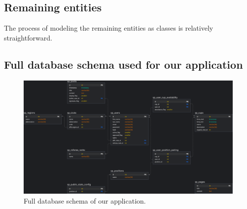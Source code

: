\subsection*{Remaining entities}
The process of modeling the remaining entities as classes is relatively straightforward.
\newpage
\subsection*{Full database schema used for our application}
\begin{figure}[h]	
	\centering	
    \includegraphics[scale=0.2175]{img/swimmpair_db_schema.png}
	\caption{Full database schema of our application.}
	\label{fig2.8:dbschemafull}
\end{figure}


